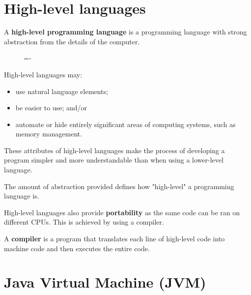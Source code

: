 \documentclass[a4paper]{systems-software}
\begin{document}
\section*{High-level languages}

A \textbf{high-level programming language} is a programming language with strong abstraction from the details of the computer.

\begin{figure}[H]
  \lineskip=-\fboxrule
\end{figure}

High-level languages may:
\begin{itemize}
	\item use natural language elements;
	\item be easier to use; and/or
	\item automate or hide entirely significant areas of computing systems, such as memory management.
\end{itemize}

These attributes of high-level languages make the process of developing a program simpler and more understandable than when using a lower-level language.

The amount of abstraction provided defines how "high-level" a programming language is.

High-level languages also provide \textbf{portability} as the same code can be ran on different CPUs. This is achieved by using a compiler.

A \textbf{compiler} is a program that translates each line of high-level code into machine code and then executes the entire code.


\newpage

\section{Java Virtual Machine (JVM)}
\end{document}
